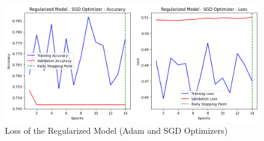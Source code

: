 \documentclass[a4paper,12pt]{article}
\begin{document}
\begin{figure}[H]
    \centering
    \includegraphics[width=1.0\textwidth]{assets/diabetes/sgd_diabetes_loss.png}
    \caption{Loss of the Regularized Model (Adam and SGD Optimizers)}
\end{figure}

\clearpage
\end{document}
